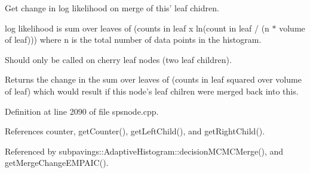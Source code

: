 \-Get change in log likelihood on merge of this' leaf chidren. 

log likelihood is sum over leaves of (counts in leaf x ln(count in leaf / (n $\ast$ volume of leaf))) where n is the total number of data points in the histogram.

\-Should only be called on cherry leaf nodes (two leaf children).

\begin{DoxyReturn}{\-Returns}
the change in the sum over leaves of (counts in leaf squared over volume of leaf) which would result if this node's leaf chilren were merged back into this. 
\end{DoxyReturn}


\-Definition at line 2090 of file spsnode.\-cpp.



\-References counter, get\-Counter(), get\-Left\-Child(), and get\-Right\-Child().



\-Referenced by subpavings\-::\-Adaptive\-Histogram\-::decision\-M\-C\-M\-C\-Merge(), and get\-Merge\-Change\-E\-M\-P\-A\-I\-C().



